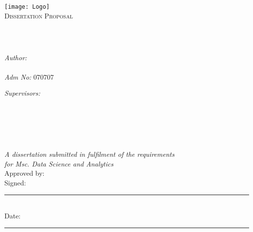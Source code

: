\documentclass[
  11pt,
  oneside,
  english,
  singlespacing,
  headsepline,
]{MastersDoctoralThesis}
\author{\href{https://bonfacemunyoki.com}{Bonface Munyoki Kilyungi}}
\begin{document}
\frontmatter

\pagestyle{plain}

\begin{titlepage}
\begin{center}

\vspace*{.06\textheight}
\texttt{[image: Logo]}\\ %
\textsc{\Large Dissertation Proposal}\\[0.5cm] %

\HRule \\[0.4cm] %
{\huge \bfseries \ttitle\par}\vspace{0.4cm} %
\HRule \\[1.5cm] %

\begin{minipage}[t]{0.4\textwidth}
\begin{flushleft} \large
\emph{Author:}\\
\href{https://bonfacemunyoki.com}{\authorname} \\
\emph{Adm No:} 070707
\end{flushleft}
\end{minipage}
\begin{minipage}[t]{0.4\textwidth}
  \begin{flushright} \large
    \emph{Supervisors:} \\
    \supnamei\\
    \supnameii\\
    \supnameiii\\
    \supnameiv
\end{flushright}
\end{minipage}\\

\vfill

\large \textit{A dissertation submitted in fulfilment of the
  requirements\\ for Msc. Data Science and Analytics}\\[1cm]

\noindent Approved by: \supnamei\\[1cm]
\noindent Signed:
\rule[0pt]{25em}{0.5pt}\\[1cm] %

\noindent Date:
\rule[0pt]{25em}{0.5pt} %


\end{center}

\end{titlepage}
\end{document}
